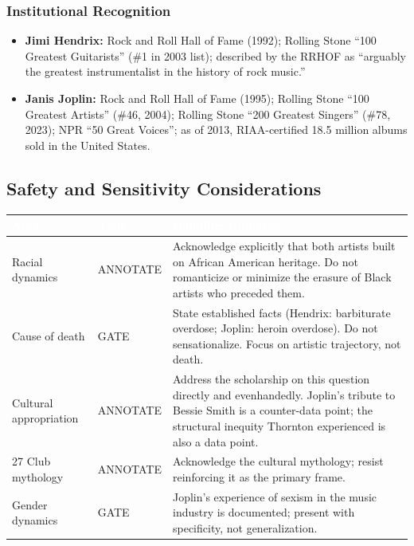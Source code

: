 \documentclass[11pt,letterpaper]{article}
\newcommand{\tableheader}[1]{\textbf{\sffamily\textcolor{white}{#1}}}
\begin{document}
\subsubsection{Institutional Recognition}

\begin{itemize}[leftmargin=*]
  \item \textbf{Jimi Hendrix:} Rock and Roll Hall of Fame (1992); Rolling Stone ``100 Greatest Guitarists'' (\#1 in 2003 list); described by the RRHOF as ``arguably the greatest instrumentalist in the history of rock music.''
  \item \textbf{Janis Joplin:} Rock and Roll Hall of Fame (1995); Rolling Stone ``100 Greatest Artists'' (\#46, 2004); Rolling Stone ``200 Greatest Singers'' (\#78, 2023); NPR ``50 Great Voices''; as of 2013, RIAA-certified 18.5 million albums sold in the United States.
\end{itemize}

\subsection{Safety and Sensitivity Considerations}

\begin{center}
\begin{tabularx}{\textwidth}{L{3cm}L{2cm}X}
\toprule
{}
\tableheader{Area} & \tableheader{Type} & \tableheader{Handling Guidance} \\
\midrule
Racial dynamics & ANNOTATE & Acknowledge explicitly that both artists built on African American heritage. Do not romanticize or minimize the erasure of Black artists who preceded them. \\
Cause of death & GATE & State established facts (Hendrix: barbiturate overdose; Joplin: heroin overdose). Do not sensationalize. Focus on artistic trajectory, not death. \\
Cultural appropriation & ANNOTATE & Address the scholarship on this question directly and evenhandedly. Joplin's tribute to Bessie Smith is a counter-data point; the structural inequity Thornton experienced is also a data point. \\
27 Club mythology & ANNOTATE & Acknowledge the cultural mythology; resist reinforcing it as the primary frame. \\
Gender dynamics & GATE & Joplin's experience of sexism in the music industry is documented; present with specificity, not generalization. \\
\bottomrule
\end{tabularx}
\end{center}
\end{document}
